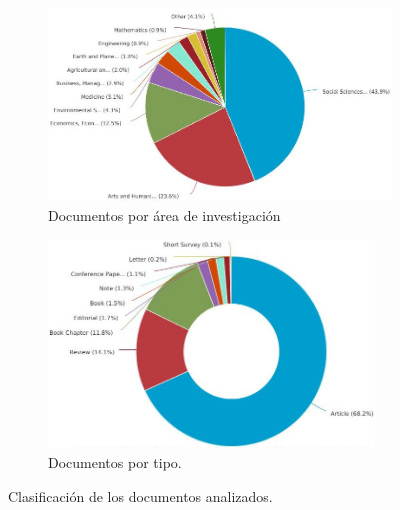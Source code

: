 


\begin{figure}[ht]

\centering
\begin{subfigure}[b]{0.48\textwidth}
\centering
\includegraphics[width=1.1\textwidth]{imagenes/Scopus-Analyze-Subject.jpg}
\caption{Documentos por área de investigación}
\label{fig:docs_area}   
\end{subfigure}
\hfill
\begin{subfigure}[b]{0.48\textwidth}
\centering
\includegraphics[width=0.95\textwidth]{imagenes/Scopus-Analyze-Doctype.jpg}
\caption{Documentos por tipo.}
\label{fig:docs_tipo} 
\end{subfigure}
\caption{Clasificación de los documentos analizados.}
\label{fig:docs_clasificacion} 
\end{figure}

